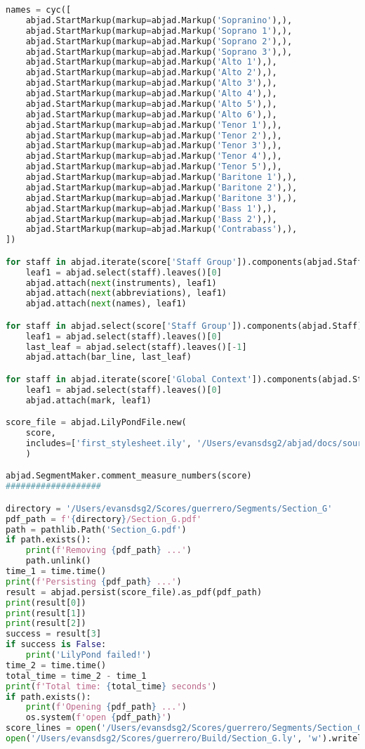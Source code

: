 \begin{lstlisting}[language=Python, caption=Invocation Source Code]
names = cyc([
    abjad.StartMarkup(markup=abjad.Markup('Sopranino'),),
    abjad.StartMarkup(markup=abjad.Markup('Soprano 1'),),
    abjad.StartMarkup(markup=abjad.Markup('Soprano 2'),),
    abjad.StartMarkup(markup=abjad.Markup('Soprano 3'),),
    abjad.StartMarkup(markup=abjad.Markup('Alto 1'),),
    abjad.StartMarkup(markup=abjad.Markup('Alto 2'),),
    abjad.StartMarkup(markup=abjad.Markup('Alto 3'),),
    abjad.StartMarkup(markup=abjad.Markup('Alto 4'),),
    abjad.StartMarkup(markup=abjad.Markup('Alto 5'),),
    abjad.StartMarkup(markup=abjad.Markup('Alto 6'),),
    abjad.StartMarkup(markup=abjad.Markup('Tenor 1'),),
    abjad.StartMarkup(markup=abjad.Markup('Tenor 2'),),
    abjad.StartMarkup(markup=abjad.Markup('Tenor 3'),),
    abjad.StartMarkup(markup=abjad.Markup('Tenor 4'),),
    abjad.StartMarkup(markup=abjad.Markup('Tenor 5'),),
    abjad.StartMarkup(markup=abjad.Markup('Baritone 1'),),
    abjad.StartMarkup(markup=abjad.Markup('Baritone 2'),),
    abjad.StartMarkup(markup=abjad.Markup('Baritone 3'),),
    abjad.StartMarkup(markup=abjad.Markup('Bass 1'),),
    abjad.StartMarkup(markup=abjad.Markup('Bass 2'),),
    abjad.StartMarkup(markup=abjad.Markup('Contrabass'),),
])

for staff in abjad.iterate(score['Staff Group']).components(abjad.Staff):
    leaf1 = abjad.select(staff).leaves()[0]
    abjad.attach(next(instruments), leaf1)
    abjad.attach(next(abbreviations), leaf1)
    abjad.attach(next(names), leaf1)

for staff in abjad.select(score['Staff Group']).components(abjad.Staff):
    leaf1 = abjad.select(staff).leaves()[0]
    last_leaf = abjad.select(staff).leaves()[-1]
    abjad.attach(bar_line, last_leaf)

for staff in abjad.iterate(score['Global Context']).components(abjad.Staff):
    leaf1 = abjad.select(staff).leaves()[0]
    abjad.attach(mark, leaf1)

score_file = abjad.LilyPondFile.new(
    score,
    includes=['first_stylesheet.ily', '/Users/evansdsg2/abjad/docs/source/_stylesheets/abjad.ily'],
    )

abjad.SegmentMaker.comment_measure_numbers(score)
###################

directory = '/Users/evansdsg2/Scores/guerrero/Segments/Section_G'
pdf_path = f'{directory}/Section_G.pdf'
path = pathlib.Path('Section_G.pdf')
if path.exists():
    print(f'Removing {pdf_path} ...')
    path.unlink()
time_1 = time.time()
print(f'Persisting {pdf_path} ...')
result = abjad.persist(score_file).as_pdf(pdf_path)
print(result[0])
print(result[1])
print(result[2])
success = result[3]
if success is False:
    print('LilyPond failed!')
time_2 = time.time()
total_time = time_2 - time_1
print(f'Total time: {total_time} seconds')
if path.exists():
    print(f'Opening {pdf_path} ...')
    os.system(f'open {pdf_path}')
score_lines = open('/Users/evansdsg2/Scores/guerrero/Segments/Section_G/Section_G.ly').readlines()
open('/Users/evansdsg2/Scores/guerrero/Build/Section_G.ly', 'w').writelines(score_lines[15:-1])


\end{lstlisting}
